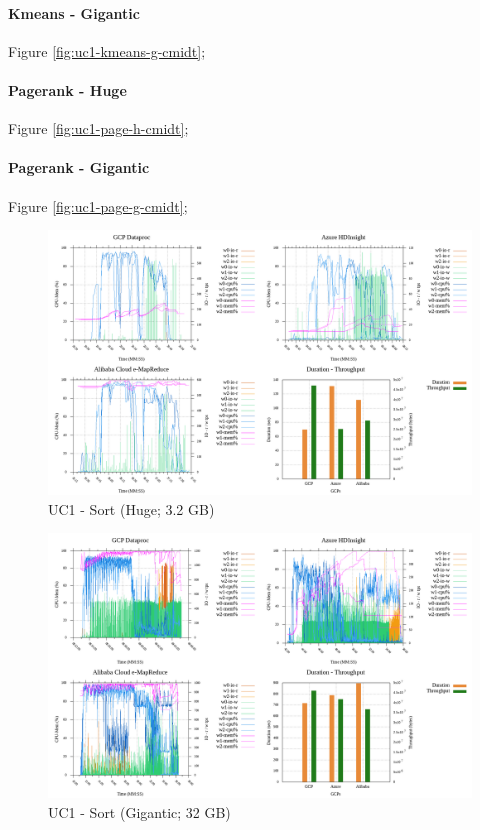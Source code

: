 \documentclass[review]{elsarticle}
\begin{document}
\paragraph{Kmeans - Gigantic} Figure \ref{fig:uc1-kmeans-g-cmidt};

\paragraph{Pagerank - Huge} Figure \ref{fig:uc1-page-h-cmidt};

\paragraph{Pagerank - Gigantic} Figure \ref{fig:uc1-page-g-cmidt};




\begin{figure}[p]
	\includegraphics[width=\textwidth]{uc1-srt-h-cmidt}
	\caption{UC1 - Sort (Huge; 3.2 GB)}
	\label{fig:uc1-srt-h-cmidt}
	\centering
\end{figure}

\begin{figure}[p]
	\includegraphics[width=\textwidth]{uc1-srt-g-cmidt}
	\caption{UC1 - Sort (Gigantic; 32 GB)}
	\label{fig:uc1-srt-g-cmidt}
	\centering
\end{figure}
\end{document}
